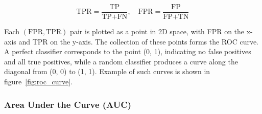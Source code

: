 \documentclass{pracalicmgr}
\begin{document}
\[
\text{TPR} = \frac{\text{TP}}{\text{TP} + \text{FN}}, \quad
\text{FPR} = \frac{\text{FP}}{\text{FP} + \text{TN}}
\]

Each \((\text{FPR}, \text{TPR})\) pair is plotted as a point in 2D space, with FPR on the x-axis and TPR on the y-axis. The collection of these points forms the ROC curve. A perfect classifier corresponds to the point (0, 1), indicating no false positives and all true positives, while a random classifier produces a curve along the diagonal from (0, 0) to (1, 1). Example of such curves is shown in figure~\ref{fig:roc_curve}.


\subsubsection{Area Under the Curve (AUC)}
\end{document}
